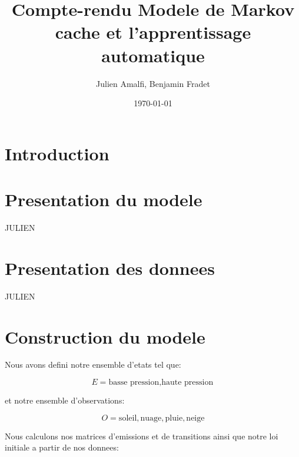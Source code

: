 \documentclass{article}
\title{Compte-rendu Modele de Markov cache et l'apprentissage automatique}
\author{Julien Amalfi, Benjamin Fradet}
\date{\today}
\begin{document}
\maketitle
\thispagestyle{fancy}


\begin{abstract}
\end{abstract}


\begin{multicols}{2}

\section{Introduction}\label{sec:intro}


\section{Presentation du modele}\label{sec:model}
JULIEN

\section{Presentation des donnees}\label{sec:donnees}
JULIEN

\section{Construction du modele}\label{sec:construct}

Nous avons defini notre ensemble d'etats tel que:

\begin{equation}
    E = {\text{basse pression}, \text{haute pression}}
\end{equation}

et notre ensemble d'observations:

\begin{equation}
    O = {\text{soleil}, \text{nuage}, \text{pluie}, \text{neige}}
\end{equation}

Nous calculons nos matrices d'emissions et de transitions ainsi que notre loi
initiale a partir de nos donnees:


\end{multicols}
\end{document}
